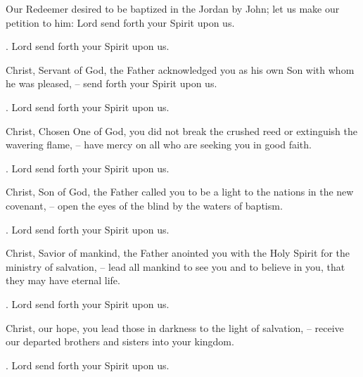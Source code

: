 \lettrine[loversize=0.15,lines=2]{O}{}ur Redeemer desired to be baptized in the Jordan by John; let us make our petition to him: Lord send forth your Spirit upon us.
\par \Rbar. Lord send forth your Spirit upon us.

Christ, Servant of God, the Father acknowledged you as his own Son with whom he was pleased,
– send forth your Spirit upon us.
\par \Rbar. Lord send forth your Spirit upon us.

Christ, Chosen One of God, you did not break the crushed reed or extinguish the wavering flame,
– have mercy on all who are seeking you in good faith.
\par \Rbar. Lord send forth your Spirit upon us.

Christ, Son of God, the Father called you to be a light to the nations in the new covenant,
– open the eyes of the blind by the waters of baptism.
\par \Rbar. Lord send forth your Spirit upon us.

Christ, Savior of mankind, the Father anointed you with the Holy Spirit for the ministry of salvation,
– lead all mankind to see you and to believe in you, that they may have eternal life.
\par \Rbar. Lord send forth your Spirit upon us.

Christ, our hope, you lead those in darkness to the light of salvation,
– receive our departed brothers and sisters into your kingdom.
\par \Rbar. Lord send forth your Spirit upon us.
